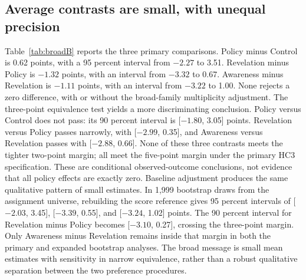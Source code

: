 \subsection{Average contrasts are small, with unequal precision}
Table~\ref{tab:broadB} reports the three primary comparisons. Policy minus Control is 0.62 points, with a 95 percent interval from $-2.27$ to 3.51. Revelation minus Policy is $-1.32$ points, with an interval from $-3.32$ to 0.67. Awareness minus Revelation is $-1.11$ points, with an interval from $-3.22$ to 1.00. None rejects a zero difference, with or without the broad-family multiplicity adjustment.
The three-point equivalence test yields a more discriminating conclusion. Policy versus Control does not pass: its 90 percent interval is [$-1.80$, 3.05] points. Revelation versus Policy passes narrowly, with [$-2.99$, 0.35], and Awareness versus Revelation passes with [$-2.88$, 0.66]. None of these three contrasts meets the tighter two-point margin; all meet the five-point margin under the primary HC3 specification. These are conditional observed-outcome conclusions, not evidence that all policy effects are exactly zero.
Baseline adjustment produces the same qualitative pattern of small estimates. In 1,999 bootstrap draws from the assignment universe, rebuilding the score reference gives 95 percent intervals of [$-2.03$, 3.45], [$-3.39$, 0.55], and [$-3.24$, 1.02] points. The 90 percent interval for Revelation minus Policy becomes [$-3.10$, 0.27], crossing the three-point margin. Only Awareness minus Revelation remains inside that margin in both the primary and expanded bootstrap analyses. The broad message is small mean estimates with sensitivity in narrow equivalence, rather than a robust qualitative separation between the two preference procedures.

